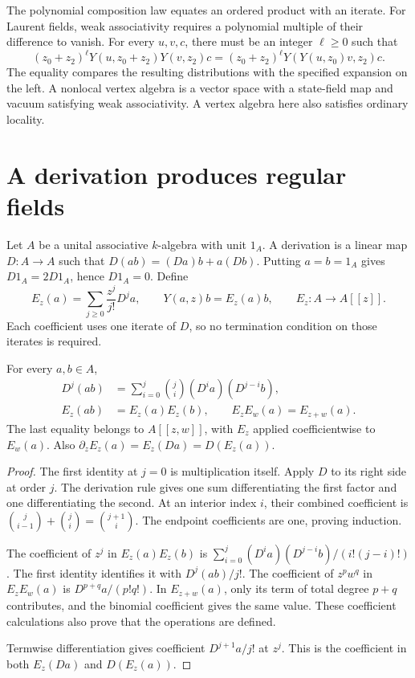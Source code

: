 The polynomial composition law equates an ordered product with an iterate.
For Laurent fields, weak associativity requires a polynomial multiple
of their difference to vanish.
For every $u,v,c$, there must be an integer $\ell\geq0$ such that
\begin{equation}\label{eq:vertex-weak-associativity}
 (z_0+z_2)^\ell Y(u,z_0+z_2)Y(v,z_2)c
  =(z_0+z_2)^\ell Y(Y(u,z_0)v,z_2)c.
\end{equation}
The equality compares the resulting distributions with the specified
expansion on the left.
A nonlocal vertex algebra is a vector space with a state-field map
and vacuum satisfying weak associativity.
A vertex algebra here also satisfies ordinary locality.

\section{A derivation produces regular fields}
\label{sec:vertex-differential-algebra}

Let $A$ be a unital associative $k$-algebra with unit $1_A$.
A derivation is a linear map $D:A\to A$ such that
$D(ab)=(Da)b+a(Db)$.
Putting $a=b=1_A$ gives $D1_A=2D1_A$, hence $D1_A=0$.
Define
\begin{equation}\label{eq:vertex-exponential-field}
 E_z(a)=\sum_{j\geq0}\frac{z^j}{j!}D^ja,
 \qquad Y(a,z)b=E_z(a)b,
 \qquad E_z:A\to A[[z]].
\end{equation}
Each coefficient uses one iterate of $D$, so no termination
condition on those iterates is required.

\begin{lemma}\label{lem:vertex-exponential-identities}
For every $a,b\in A$,
\[
 \begin{aligned}
 D^j(ab)&=\sum_{i=0}^j\binom ji(D^ia)(D^{j-i}b),\\
 E_z(ab)&=E_z(a)E_z(b),\qquad E_zE_w(a)=E_{z+w}(a).
 \end{aligned}
\]
The last equality belongs to $A[[z,w]]$, with $E_z$ applied
coefficientwise to $E_w(a)$.
Also $\partial_zE_z(a)=E_z(Da)=D(E_z(a))$.
\end{lemma}

\begin{proof}
The first identity at $j=0$ is multiplication itself.
Apply $D$ to its right side at order $j$.
The derivation rule gives one sum differentiating the first factor
and one differentiating the second.
At an interior index $i$, their combined coefficient is
$\binom j{i-1}+\binom ji=\binom{j+1}i$.
The endpoint coefficients are one, proving induction.

The coefficient of $z^j$ in $E_z(a)E_z(b)$ is
$\sum_{i=0}^j(D^ia)(D^{j-i}b)/(i!(j-i)!)$.
The first identity identifies it with $D^j(ab)/j!$.
The coefficient of $z^pw^q$ in $E_zE_w(a)$ is
$D^{p+q}a/(p!q!)$.
In $E_{z+w}(a)$, only its term of total degree $p+q$ contributes,
and the binomial coefficient gives the same value.
These coefficient calculations also prove that the operations are defined.

Termwise differentiation gives coefficient $D^{j+1}a/j!$ at $z^j$.
This is the coefficient in both $E_z(Da)$ and $D(E_z(a))$.
\end{proof}

